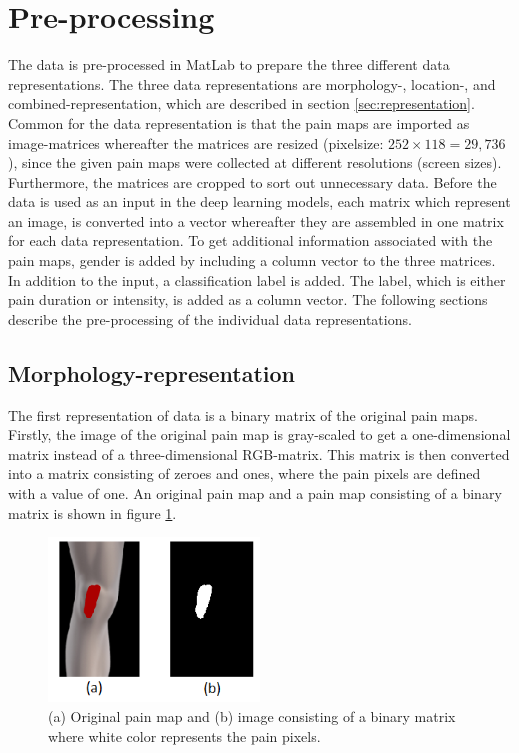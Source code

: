 \section{Pre-processing} \label{sec:prepros}
The data is pre-processed in MatLab to prepare the three different data representations. The three data representations are morphology-, location-, and combined-representation, which are described in section \ref{sec:representation}. Common for the data representation is that the pain maps are imported as image-matrices whereafter the matrices are resized (pixelsize: $252 \times 118 = 29,736$), since the given pain maps were collected at different resolutions (screen sizes). Furthermore, the matrices are cropped to sort out unnecessary data.
Before the data is used as an input in the deep learning models, each matrix which represent an image, is converted into a vector whereafter they are assembled in one matrix for each data representation. To get additional information associated with the pain maps, gender is added by including a column vector to the three matrices.
In addition to the input, a classification label is added. The label, which is either pain duration or intensity, is added as a column vector.
The following sections describe the pre-processing of the individual data representations.

\subsection{Morphology-representation} \label{sec:Morph}
The first representation of data is a binary matrix of the original pain maps.
Firstly, the image of the original pain map is gray-scaled to get a one-dimensional matrix instead of a three-dimensional RGB-matrix. This matrix is then converted into a matrix consisting of zeroes and ones, where the pain pixels are defined with a value of one. An original pain map and a pain map consisting of a binary matrix is shown in figure \ref{fig:cropbin7}.

\begin{figure} [H]
\centering
\includegraphics[width=0.5\textwidth]{figures/cropbin7}
\caption{(a) Original pain map and (b) image consisting of a binary matrix where white color represents the pain pixels.}
\label{fig:cropbin7}
\end{figure}


